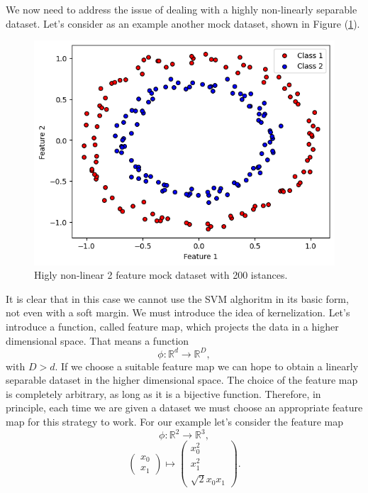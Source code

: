 \documentclass[a4paper]{article}
\begin{document}
We now need to address the issue of dealing with a highly non-linearly separable dataset. Let's consider as an example another mock dataset, shown in Figure (\ref{fig:classical svm circles}). 
\begin{figure}[h!]
    \centering
    \includegraphics[width=\textwidth]{images/circles.png}
    \caption{Higly non-linear 2 feature mock dataset with 200 istances.}
    \label{fig:classical svm circles}
\end{figure}
It is clear that in this case we cannot use the SVM alghoritm in its basic form, not even with a soft margin. We must introduce the idea of kernelization. 
Let's introduce a function, called feature map, which projects the data in a higher dimensional space. That means a function
\begin{equation}
    \phi:\mathbb{R}^d\rightarrow\mathbb{R}^D,
\end{equation}
with $D>d$. If we choose a suitable feature map we can hope to obtain a linearly separable dataset in the higher dimensional space. The choice of the feature map is completely arbitrary, as long as it is a bijective function. Therefore, in principle, each time we are given a dataset we must choose an appropriate feature map for this strategy to work. For our example let's consider the feature map
$$    \phi:\mathbb{R}^2\rightarrow\mathbb{R}^3,$$
\begin{equation}
    \begin{pmatrix}
        x_0\\
        x_1
        \end{pmatrix} \mapsto  
        \begin{pmatrix}
        x_0^2 \\
        x_1^2\\
        \sqrt{2}x_0x_1
        \end{pmatrix} .
\end{equation}
\end{document}
